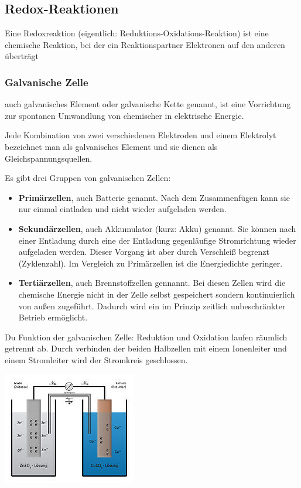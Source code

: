 \documentclass[../document.tex]{subfiles}
\begin{document}
\subsection{Redox-Reaktionen}
Eine Redoxreaktion (eigentlich: Reduktions-Oxidations-Reaktion) ist eine chemische Reaktion, bei der ein Reaktionspartner Elektronen auf den anderen überträgt

\subsubsection{Galvanische Zelle}
auch galvanisches Element oder galvanische Kette genannt, ist eine Vorrichtung zur spontanen Umwandlung von chemischer in elektrische Energie.

Jede Kombination von zwei verschiedenen Elektroden und einem Elektrolyt bezeichnet man als galvanisches Element und sie dienen als Gleichspannungsquellen.

Es gibt drei Gruppen von galvanischen Zellen:
\begin{itemize}
	\item \textbf{Primärzellen}, auch Batterie genannt. Nach dem Zusammenfügen kann sie nur einmal eintladen und nicht wieder aufgeladen werden. 
	\item \textbf{Sekundärzellen}, auch Akkumulator (kurz: Akku) genannt. Sie können nach einer Entladung durch eine der Entladung gegenläufige Stromrichtung wieder aufgeladen werden. Dieser Vorgang ist aber durch Verschleiß begrenzt (Zyklenzahl). Im Vergleich zu Primärzellen ist die Energiedichte geringer.
	\item \textbf{Tertiärzellen}, auch Brennstoffzellen gennannt. Bei diesen Zellen wird die chemische Energie nicht in der Zelle selbst gespeichert sondern kontinuierlich von außen zugeführt. Dadurch wird ein im Prinzip zeitlich unbeschränkter Betrieb ermöglicht.
\end{itemize}

Du Funktion der galvanischen Zelle: Reduktion und Oxidation laufen räumlich getrennt ab. Durch verbinden der beiden Halbzellen mit einem Ionenleiter und einem Stromleiter wird der Stromkreis geschlossen.

\includegraphics{images/daniell_element} %
\end{document}
